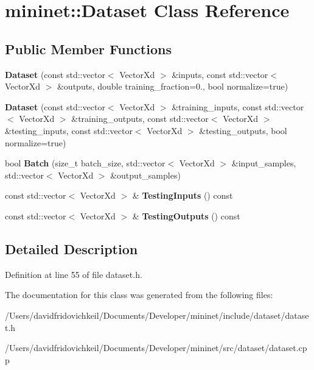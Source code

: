 \hypertarget{classmininet_1_1_dataset}{}\section{mininet\+:\+:Dataset Class Reference}
\label{classmininet_1_1_dataset}
\subsection*{Public Member Functions}
\begin{DoxyCompactItemize}
\item 
\hypertarget{classmininet_1_1_dataset_ad0c45ef8b680a3bae1e3d4e0268de440}{}\label{classmininet_1_1_dataset_ad0c45ef8b680a3bae1e3d4e0268de440} 
{\bfseries Dataset} (const std\+::vector$<$ Vector\+Xd $>$ \&inputs, const std\+::vector$<$ Vector\+Xd $>$ \&outputs, double training\+\_\+fraction=0., bool normalize=true)
\item 
\hypertarget{classmininet_1_1_dataset_ac7fb96d2ffab1e1733c51a52e756faa4}{}\label{classmininet_1_1_dataset_ac7fb96d2ffab1e1733c51a52e756faa4} 
{\bfseries Dataset} (const std\+::vector$<$ Vector\+Xd $>$ \&training\+\_\+inputs, const std\+::vector$<$ Vector\+Xd $>$ \&training\+\_\+outputs, const std\+::vector$<$ Vector\+Xd $>$ \&testing\+\_\+inputs, const std\+::vector$<$ Vector\+Xd $>$ \&testing\+\_\+outputs, bool normalize=true)
\item 
\hypertarget{classmininet_1_1_dataset_a537e957564a9a742a41dc5da2cc64f9e}{}\label{classmininet_1_1_dataset_a537e957564a9a742a41dc5da2cc64f9e} 
bool {\bfseries Batch} (size\+\_\+t batch\+\_\+size, std\+::vector$<$ Vector\+Xd $>$ \&input\+\_\+samples, std\+::vector$<$ Vector\+Xd $>$ \&output\+\_\+samples)
\item 
\hypertarget{classmininet_1_1_dataset_a9d1fa0b517a7f478ac3ffc3fd63b669d}{}\label{classmininet_1_1_dataset_a9d1fa0b517a7f478ac3ffc3fd63b669d} 
const std\+::vector$<$ Vector\+Xd $>$ \& {\bfseries Testing\+Inputs} () const
\item 
\hypertarget{classmininet_1_1_dataset_a285f104f5af9647180b19acc95e1b5fa}{}\label{classmininet_1_1_dataset_a285f104f5af9647180b19acc95e1b5fa} 
const std\+::vector$<$ Vector\+Xd $>$ \& {\bfseries Testing\+Outputs} () const
\end{DoxyCompactItemize}


\subsection{Detailed Description}


Definition at line 55 of file dataset.\+h.



The documentation for this class was generated from the following files\+:\begin{DoxyCompactItemize}
\item 
/\+Users/davidfridovichkeil/\+Documents/\+Developer/mininet/include/dataset/dataset.\+h\item 
/\+Users/davidfridovichkeil/\+Documents/\+Developer/mininet/src/dataset/dataset.\+cpp\end{DoxyCompactItemize}

